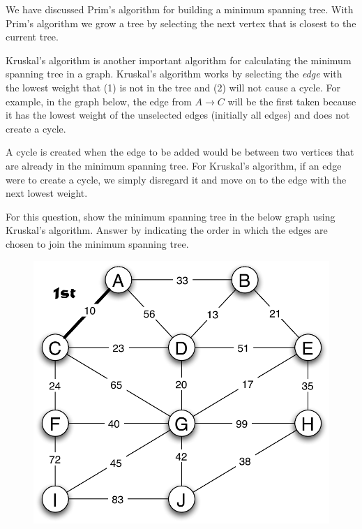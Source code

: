 \documentclass[11pt]{exam}
\begin{document}
\begin{questions}
\newpage
\question[20] We have discussed Prim's algorithm for building a minimum spanning tree.  With Prim's algorithm we grow a tree by selecting the next vertex that is closest to the current tree.
\par
Kruskal's algorithm is another important algorithm for calculating the minimum spanning tree in a graph.  Kruskal's algorithm works by selecting the {\it edge} with the lowest weight that (1) is not in the tree and (2) will not cause a cycle.  For example, in the graph below, the edge from $A \rightarrow C$ will be the first taken because it has the lowest weight of the unselected edges (initially all edges) and does not create a cycle.  
\par
A cycle is created when the edge to be added would be between two vertices that are already in the minimum spanning tree.   For Kruskal's algorithm, if an edge were to create a cycle, we simply disregard it and move on to the edge with the next lowest weight.
\par
For this question, show the minimum spanning tree in the below graph using Kruskal's algorithm.   Answer by indicating the order in which the edges are chosen to join the minimum spanning tree.
\begin{figure}[htbp]
	\begin{center}
	   \includegraphics[width=6.0in]{final_mst_graph}
	\end{center}   
\end{figure}


\end{questions}
\end{document}
